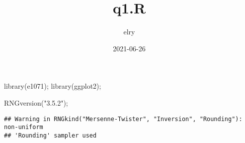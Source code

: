 \documentclass[
]{article}
\title{q1.R}
\author{elry}
\date{2021-06-26}
\newenvironment{Shaded}{\begin{snugshade}}{\end{snugshade}}
\newcommand{\FunctionTok}[1]{\textcolor[rgb]{0.00,0.00,0.00}{#1}}
\newcommand{\NormalTok}[1]{#1}
\newcommand{\StringTok}[1]{\textcolor[rgb]{0.31,0.60,0.02}{#1}}
\begin{document}
\maketitle

\begin{Shaded}
\begin{Highlighting}[]
\FunctionTok{library}\NormalTok{(e1071);}
\FunctionTok{library}\NormalTok{(ggplot2);}

\FunctionTok{RNGversion}\NormalTok{(}\StringTok{"3.5.2"}\NormalTok{);}
\end{Highlighting}
\end{Shaded}

\begin{verbatim}
## Warning in RNGkind("Mersenne-Twister", "Inversion", "Rounding"): non-uniform
## 'Rounding' sampler used
\end{verbatim}
\end{document}
